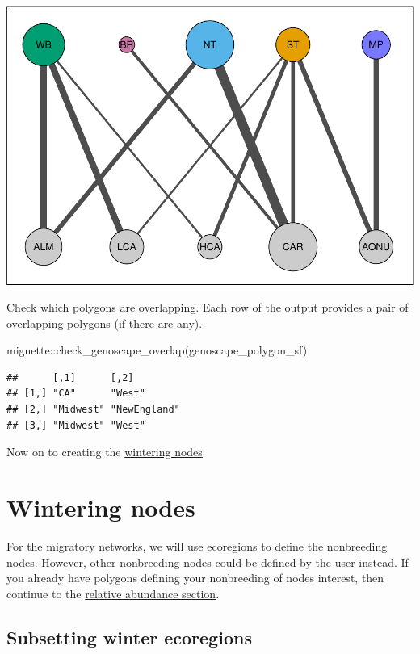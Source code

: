 \documentclass[
]{book}
\newenvironment{Shaded}{\begin{snugshade}}{\end{snugshade}}
\newcommand{\FunctionTok}[1]{\textcolor[rgb]{0.00,0.00,0.00}{#1}}
\newcommand{\NormalTok}[1]{#1}
\newcommand{\SpecialCharTok}[1]{\textcolor[rgb]{0.00,0.00,0.00}{#1}}
\begin{document}
\includegraphics[width=0.7\linewidth]{Mignette_files/figure-latex/unnamed-chunk-7-1}

Check which polygons are overlapping. Each row of the output provides a pair of overlapping polygons (if there are any).

\begin{Shaded}
\begin{Highlighting}[]
\NormalTok{mignette}\SpecialCharTok{::}\FunctionTok{check\_genoscape\_overlap}\NormalTok{(genoscape\_polygon\_sf)}
\end{Highlighting}
\end{Shaded}

\begin{verbatim}
##      [,1]      [,2]        
## [1,] "CA"      "West"      
## [2,] "Midwest" "NewEngland"
## [3,] "Midwest" "West"
\end{verbatim}

Now on to creating the \protect\hyperlink{wintering}{wintering nodes}

\hypertarget{wintering}{%
\chapter{Wintering nodes}\label{wintering}}

For the migratory networks, we will use ecoregions to define the nonbreeding nodes. However, other nonbreeding nodes could be defined by the user instead. If you already have polygons defining your nonbreeding of nodes interest, then continue to the \protect\hyperlink{abundance}{relative abundance section}.

\hypertarget{subsetting-winter-ecoregions}{%
\section{Subsetting winter ecoregions}\label{subsetting-winter-ecoregions}}
\end{document}

